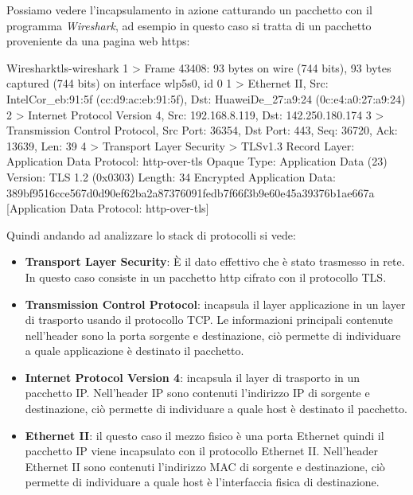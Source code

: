 Possiamo vedere l'incapsulamento in azione catturando un pacchetto con il programma \textit{Wireshark}, ad esempio in questo caso si tratta di un pacchetto proveniente da una pagina web https:

\begin{bashcode}{Wireshark}{tls-wireshark}
1 > Frame 43408: 93 bytes on wire (744 bits), 93 bytes captured (744 bits) on interface wlp5s0, id 0
1 > Ethernet II, Src: IntelCor_eb:91:5f (cc:d9:ac:eb:91:5f), Dst: HuaweiDe_27:a9:24 (0c:e4:a0:27:a9:24)
2 > Internet Protocol Version 4, Src: 192.168.8.119, Dst: 142.250.180.174
3 > Transmission Control Protocol, Src Port: 36354, Dst Port: 443, Seq: 36720, Ack: 13639, Len: 39
4 > Transport Layer Security
> TLSv1.3 Record Layer: Application Data Protocol: http-over-tls
Opaque Type: Application Data (23)
Version: TLS 1.2 (0x0303)
Length: 34
Encrypted Application Data: 389bf9516cce567d0d90ef62ba2a87376091fedb7f66f3b9e60e45a39376b1ae667a
    [Application Data Protocol: http-over-tls]
\end{bashcode}

\todo[da perfezionare]

Quindi andando ad analizzare lo stack di protocolli si vede:

\begin{itemize}
    \item \textbf{Transport Layer Security}\cite{RFC_8446}: È il dato effettivo che è stato trasmesso in rete. In questo caso consiste in un pacchetto http cifrato con il protocollo TLS.

    \item \textbf{Transmission Control Protocol}\cite{RFC_0793}: incapsula il layer applicazione in un layer di trasporto usando il protocollo TCP. Le informazioni principali contenute nell'header sono la porta sorgente e destinazione, ciò permette di individuare a quale applicazione è destinato il pacchetto.
    
    \item \textbf{Internet Protocol Version 4}\cite{RFC_0791}: incapsula il layer di trasporto in un pacchetto IP. Nell'header IP sono contenuti l'indirizzo IP di sorgente e destinazione, ciò permette di individuare a quale host è destinato il pacchetto.
    
    \item \textbf{Ethernet II}\cite{ethernet-ii}: il questo caso il mezzo fisico è una porta Ethernet quindi il pacchetto IP viene incapsulato con il protocollo Ethernet II. Nell'header Ethernet II sono contenuti l'indirizzo MAC di sorgente e destinazione, ciò permette di individuare a quale host è l'interfaccia fisica di destinazione.
\end{itemize}

